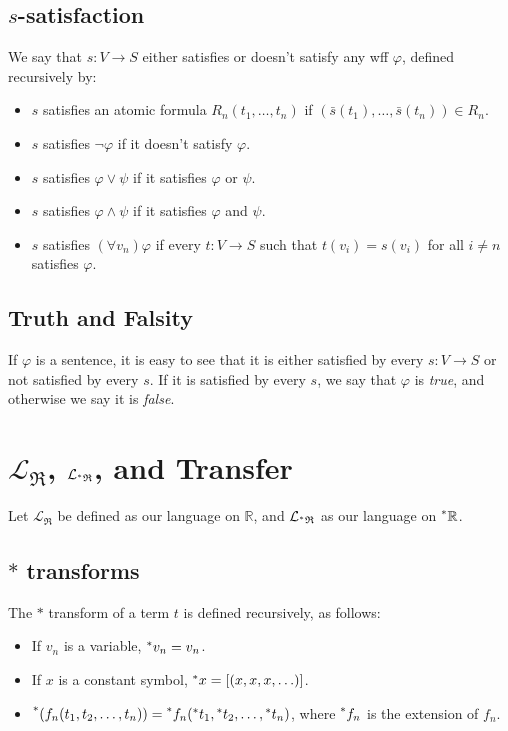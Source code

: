 \documentclass{article}
\newcommand{\reals}{\mathbb{R}}
\newcommand{\hreals}{\prescript{*}{}{\mathbb{R}}}
\newcommand{\hr}[1]{\prescript{*}{}{#1}}
\begin{document}
\subsection{$s$-satisfaction}
We say that $s: V \to S$ either satisfies or doesn't satisfy any wff $\varphi$, defined recursively by:
\begin{itemize}
    \item $s$ satisfies an atomic formula $R_n(t_1, \ldots, t_n)$ if $(\bar s(t_1), \ldots, \bar s(t_n)) \in R_n$.
    \item $s$ satisfies $\neg \varphi$ if it doesn't satisfy $\varphi$.
    \item $s$ satisfies $\varphi \lor \psi$ if it satisfies $\varphi$ or $\psi$.
    \item $s$ satisfies $\varphi \land \psi$ if it satisfies $\varphi$ and $\psi$.
    \item $s$ satisfies $(\forall v_n) \varphi$ if every $t: V \to S$ such that $t(v_i) = s(v_i)$ for all $i \neq n$ satisfies $\varphi$.
\end{itemize}

\subsection{Truth and Falsity}
If $\varphi$ is a sentence, it is easy to see that it is either satisfied by every $s: V \to S$ or not satisfied by every $s$. If it is satisfied by every $s$, we say that $\varphi$ is \textit{true}, and otherwise we say it is \textit{false}.

\section{$\mathcal{L}_\mathfrak{R}$, $\mathcal{L}_{\hr{\mathfrak{R}}}$, and Transfer}
Let $\mathcal{L}_\mathfrak{R}$ be defined as our language on $\reals$, and $\mathcal{L}_{\hr{\mathfrak{R}}}$ as our language on $\hreals$.

\subsection{$\ast$ transforms}
The $\ast$ transform of a term $t$ is defined recursively, as follows:
\begin{itemize}
    \item If $v_n$ is a variable, $\hr{v_n} = v_n$.
    \item If $x$ is a constant symbol, $\hr{x} = [(x, x, x, \ldots)]$.
    \item $\hr{(f_n(t_1, t_2, \ldots, t_n))} = \hr{f_n}(\hr{t_1}, \hr{t_2}, \ldots, \hr{t_n})$, where $\hr{f_n}$ is the extension of $f_n$.
\end{itemize}
\end{document}
